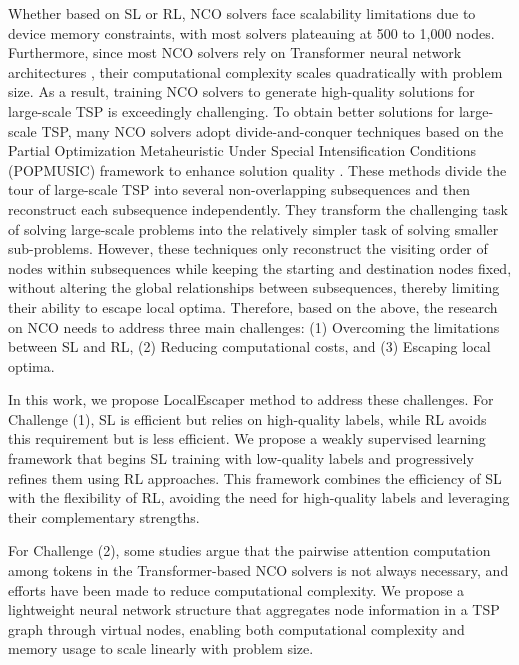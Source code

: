 Whether based on SL or RL, NCO solvers face scalability limitations due to device memory constraints, with most solvers plateauing at 500 to 1,000 nodes. Furthermore, since most NCO solvers rely on Transformer neural network architectures \cite{vaswani2017attention}, their computational complexity scales quadratically with problem size. As a result, training NCO solvers to generate high-quality solutions for large-scale TSP is exceedingly challenging.
To obtain better solutions for large-scale TSP, many NCO solvers adopt divide-and-conquer techniques based on the Partial Optimization Metaheuristic Under Special Intensification Conditions (POPMUSIC) \cite{taillard2019popmusic} framework to enhance solution quality \cite{cheng2023select,luo2023neural,ye2024glop,zheng2024udc}.
These methods divide the tour of large-scale TSP into several non-overlapping subsequences and then reconstruct each subsequence independently. They transform the challenging task of solving large-scale problems into the relatively simpler task of solving smaller sub-problems. However, these techniques only reconstruct the visiting order of nodes within subsequences while keeping the starting and destination nodes fixed, without altering the global relationships between subsequences, thereby limiting their ability to escape local optima.
Therefore, based on the above, the research on NCO needs to address three main challenges: (1) Overcoming the limitations between SL and RL, (2) Reducing computational costs, and (3) Escaping local optima.

In this work, we propose LocalEscaper method to address these challenges. 
For Challenge (1), SL is efficient but relies on high-quality labels, while RL avoids this requirement but is less efficient. 
We propose a weakly supervised learning framework that begins SL training with low-quality labels and progressively refines them using RL approaches. This framework combines the efficiency of SL with the flexibility of RL, avoiding the need for high-quality labels and leveraging their complementary strengths.

For Challenge (2), some studies \cite{yang2023memory, luo2024self} argue that the pairwise attention computation among tokens in the Transformer-based NCO solvers is not always necessary, and efforts have been made to reduce computational complexity. We propose a lightweight neural network structure that aggregates node information in a TSP graph through virtual nodes, enabling both computational complexity and memory usage to scale linearly with problem size.

